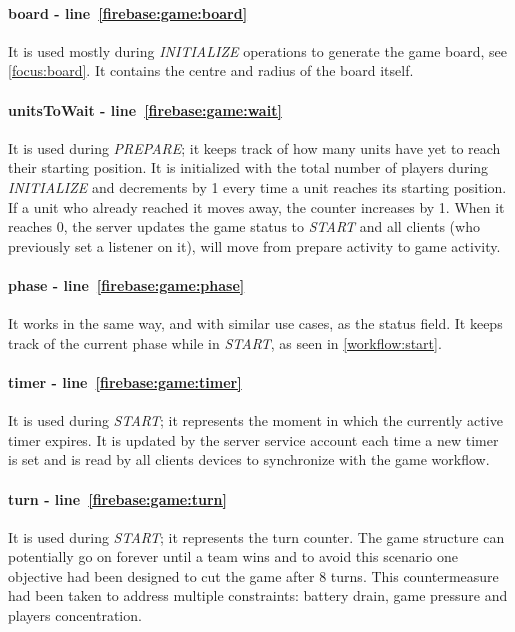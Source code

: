 				\paragraph{board - line~\ref{firebase:game:board}}
				It is used mostly during \emph{INITIALIZE} operations to generate the game board, see \autoref{focus:board}.
				It contains the centre and radius of the board itself.
				
				\paragraph{unitsToWait - line~\ref{firebase:game:wait}}
				It is used during \emph{PREPARE}; it keeps track of how many units have yet to reach their starting position.
				It is initialized with the total number of players during \emph{INITIALIZE} and decrements by 1 every time a unit reaches its starting position.
				If a unit who already reached it moves away, the counter increases by 1.
				When it reaches 0, the server updates the game status to \emph{START} and all clients (who previously set a listener on it), will move from prepare activity to game activity.
				
				\paragraph{phase - line~\ref{firebase:game:phase}}
				It works in the same way, and with similar use cases, as the status field.
				It keeps track of the current phase while in \emph{START}, as seen in \autoref{workflow:start}.
				
				\paragraph{timer - line~\ref{firebase:game:timer}}
				It is used during \emph{START}; it represents the moment in which the currently active timer expires. It is updated by the server service account each time a new timer is set and is read by all clients devices to synchronize with the game workflow.
				
				\paragraph{turn - line~\ref{firebase:game:turn}}
				It is used during \emph{START}; it represents the turn counter. The game structure can potentially go on forever until a team wins and to avoid this scenario one objective had been designed to cut the game after 8 turns.
				This countermeasure had been taken to address multiple constraints: battery drain, game pressure and players concentration.
				

